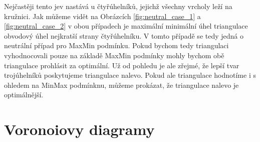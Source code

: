 \documentclass[12pt,a4paper]{article}
\begin{document}
\newpage
\begin{figure}[h!]
\centering
\begin{floatrow}
\end{floatrow}
\end{figure}

Nejčastěji tento jev nastává u čtyřúhelníků, jejichž všechny vrcholy leží na kružnici. Jak můžeme vidět na Obrázcích \ref{fig:neutral_case_1} a \ref{fig:neutral_case_2} v obou případech je maximální minimální úhel triangulace obvodový úhel nejkratší strany čtyřúhelníku. V tomto případě se tedy jedná o neutrální případ pro MaxMin podmínku. Pokud bychom tedy triangulaci vyhodnocovali pouze na základě MaxMin podmínky mohly bychom obě triangulace prohlásit za optimální. Už od pohledu je ale zřejmé, že lepší tvar trojúhelníků poskytujeme triangulace nalevo. Pokud ale triangulace hodnotíme i s ohledem na MinMax podmínknu, můžeme prokázat, že triangulace nalevo je optimálnější.

\newpage
\section{Voronoiovy diagramy}
\end{document}
